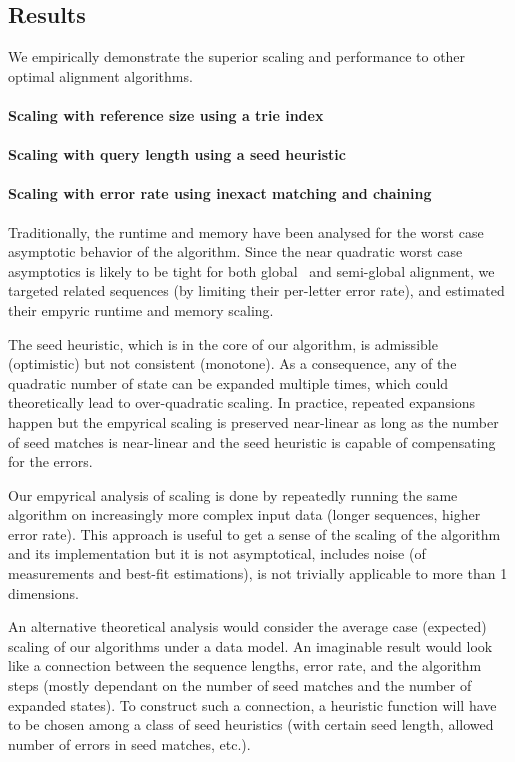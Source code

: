 \subsection*{Results}

We empirically demonstrate the superior scaling and performance to other optimal
alignment algorithms.

\paragraph{Scaling with reference size using a trie index}
\paragraph{Scaling with query length using a seed heuristic}
\paragraph{Scaling with error rate using inexact matching and chaining}

Traditionally, the runtime and memory have been analysed for the worst case
asymptotic behavior of the algorithm. Since the near quadratic worst case
asymptotics is likely to be tight for both global~\citep{backurs2015edit} and
semi-global alignment, we targeted related sequences (by limiting their
per-letter error rate), and estimated their empyric runtime and memory scaling.

The seed heuristic, which is in the core of our \A algorithm, is admissible
(optimistic) but not consistent (monotone). As a consequence, any of the
quadratic number of state can be expanded multiple times, which could
theoretically lead to over-quadratic scaling. In practice, repeated expansions
happen but the empyrical scaling is preserved near-linear as long as the number
of seed matches is near-linear and the seed heuristic is capable of compensating
for the errors.

Our empyrical analysis of scaling is done by repeatedly running the same
algorithm on increasingly more complex input data (\AG longer sequences, higher
error rate). This approach is useful to get a sense of the scaling of the
algorithm and its implementation but it is not asymptotical, includes noise (of
measurements and best-fit estimations), is not trivially applicable to more than
1 dimensions.

An alternative theoretical analysis would consider the average case (expected)
scaling of our algorithms under a data model. An imaginable result would look
like a connection between the sequence lengths, error rate, and the algorithm
steps (mostly dependant on the number of seed matches and the number of expanded
states). To construct such a connection, a heuristic function will have to be
chosen among a class of seed heuristics (\AG with certain seed length, allowed
number of errors in seed matches, etc.).

